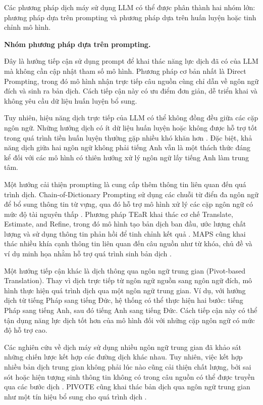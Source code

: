 Các phương pháp dịch máy sử dụng LLM có thể được phân thành hai nhóm lớn: phương pháp dựa trên prompting và phương pháp dựa trên huấn luyện hoặc tinh chỉnh mô hình.

\textbf{Nhóm phương pháp dựa trên prompting.}

Đây là hướng tiếp cận sử dụng prompt để khai thác năng lực dịch đã có của LLM mà không cần cập nhật tham số mô hình. Phương pháp cơ bản nhất là Direct Prompting, trong đó mô hình nhận trực tiếp câu nguồn cùng chỉ dẫn về ngôn ngữ đích và sinh ra bản dịch. Cách tiếp cận này có ưu điểm đơn giản, dễ triển khai và không yêu cầu dữ liệu huấn luyện bổ sung.

Tuy nhiên, hiệu năng dịch trực tiếp của LLM có thể không đồng đều giữa các cặp ngôn ngữ. Những hướng dịch có ít dữ liệu huấn luyện hoặc không được hỗ trợ tốt trong quá trình tiền huấn luyện thường gặp nhiều khó khăn hơn \cite{zhu-etal-2024-multilingual}. Đặc biệt, khả năng dịch giữa hai ngôn ngữ không phải tiếng Anh vẫn là một thách thức đáng kể đối với các mô hình có thiên hướng xử lý ngôn ngữ lấy tiếng Anh làm trung tâm.

Một hướng cải thiện prompting là cung cấp thêm thông tin liên quan đến quá trình dịch. Chain-of-Dictionary Prompting sử dụng các chuỗi từ điển đa ngôn ngữ để bổ sung thông tin từ vựng, qua đó hỗ trợ mô hình xử lý các cặp ngôn ngữ có mức độ tài nguyên thấp \cite{lu-etal-2024-chain}. Phương pháp TEaR khai thác cơ chế Translate, Estimate, and Refine, trong đó mô hình tạo bản dịch ban đầu, ước lượng chất lượng và sử dụng thông tin phản hồi để tinh chỉnh kết quả \cite{feng-etal-2025-tear}. MAPS cũng khai thác nhiều khía cạnh thông tin liên quan đến câu nguồn như từ khóa, chủ đề và ví dụ minh họa nhằm hỗ trợ quá trình sinh bản dịch \cite{he-etal-2024-exploring}.

Một hướng tiếp cận khác là dịch thông qua ngôn ngữ trung gian (Pivot-based Translation). Thay vì dịch trực tiếp từ ngôn ngữ nguồn sang ngôn ngữ đích, mô hình thực hiện quá trình dịch qua một ngôn ngữ trung gian. Ví dụ, với hướng dịch từ tiếng Pháp sang tiếng Đức, hệ thống có thể thực hiện hai bước: tiếng Pháp sang tiếng Anh, sau đó tiếng Anh sang tiếng Đức. Cách tiếp cận này có thể tận dụng năng lực dịch tốt hơn của mô hình đối với những cặp ngôn ngữ có mức độ hỗ trợ cao.

Các nghiên cứu về dịch máy sử dụng nhiều ngôn ngữ trung gian đã khảo sát những chiến lược kết hợp các đường dịch khác nhau. Tuy nhiên, việc kết hợp nhiều bản dịch trung gian không phải lúc nào cũng cải thiện chất lượng, bởi sai sót hoặc hiện tượng sinh thông tin không có trong câu nguồn có thể được truyền qua các bước dịch \cite{mohammadshahi-etal-2024-investigating}. PIVOTE cũng khai thác bản dịch qua ngôn ngữ trung gian như một tín hiệu bổ sung cho quá trình dịch \cite{oh2025single}.

